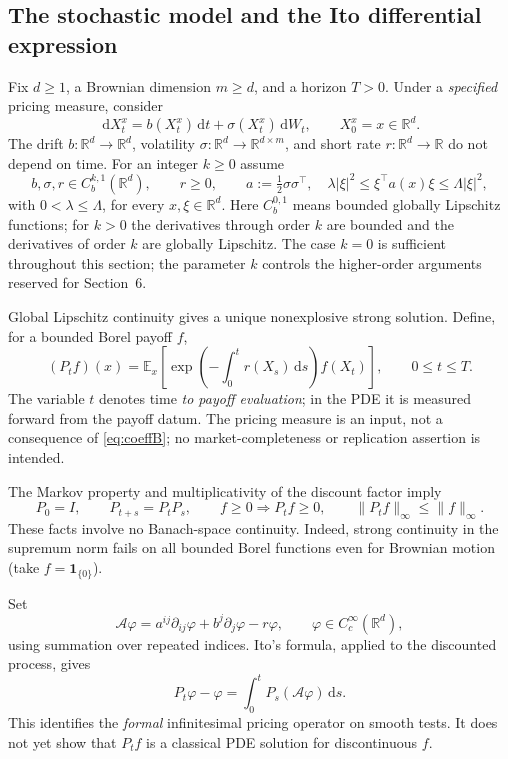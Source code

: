 \documentclass[11pt,a4paper]{article}
\theoremstyle{definition}\newtheorem{definition}{Definition}[section]\newtheorem{example}[theorem]{Example}
\theoremstyle{remark}\newtheorem{remark}[theorem]{Remark}\newtheorem{remarkSix}{Remark}[section]
\newcommand{\Rd}{\mathbb R^d}
\newcommand{\R}{\mathbb R}
\newcommand{\E}{\mathbb E}
\newcommand{\Cc}{C_c^\infty}
\newcommand{\dd}{\,\mathrm d}
\newcommand{\norm}[1]{\lVert #1\rVert}
\newcommand{\cA}{\mathcal A}
\begin{document}
\subsection{The stochastic model and the Ito differential expression}
\label{subsec:modelB}
Fix $d\ge1$, a Brownian dimension $m\ge d$, and a horizon $T>0$. Under a \emph{specified} pricing measure, consider
\begin{equation}\label{eq:sdeB}
\dd X_t^x=b(X_t^x)\dd t+\sigma(X_t^x)\dd W_t,
\qquad X_0^x=x\in\Rd.
\end{equation}
The drift $b:\Rd\to\Rd$, volatility $\sigma:\Rd\to\R^{d\times m}$, and short rate $r:\Rd\to\R$ do not depend on time. For an integer $k\ge0$ assume
\begin{equation}\label{eq:coeffB}
 b,\sigma,r\in C_b^{k,1}(\Rd),\qquad r\ge0,
 \qquad a:=\tfrac12\sigma\sigma^\top,
 \quad \lambda|\xi|^2\le\xi^\top a(x)\xi\le\Lambda|\xi|^2,
\end{equation}
with $0<\lambda\le\Lambda$, for every $x,\xi\in\Rd$. Here $C_b^{0,1}$ means bounded globally Lipschitz functions; for $k>0$ the derivatives through order $k$ are bounded and the derivatives of order $k$ are globally Lipschitz. The case $k=0$ is sufficient throughout this section; the parameter $k$ controls the higher-order arguments reserved for Section~6.

Global Lipschitz continuity gives a unique nonexplosive strong solution. Define, for a bounded Borel payoff $f$,
\begin{equation}\label{eq:PdefB}
 (P_tf)(x)=\E_x\!\left[
 \exp\!\left(-\int_0^t r(X_s)\dd s\right)f(X_t)
 \right],\qquad 0\le t\le T.
\end{equation}
The variable $t$ denotes time \emph{to payoff evaluation}; in the PDE it is measured forward from the payoff datum. The pricing measure is an input, not a consequence of \eqref{eq:coeffB}; no market-completeness or replication assertion is intended.

The Markov property and multiplicativity of the discount factor imply
\begin{equation}\label{eq:algB}
 P_0=I,\qquad P_{t+s}=P_tP_s,\qquad
 f\ge0\Longrightarrow P_tf\ge0,\qquad
 \norm{P_tf}_\infty\le\norm f_\infty.
\end{equation}
These facts involve no Banach-space continuity. Indeed, strong continuity in the supremum norm fails on all bounded Borel functions even for Brownian motion (take $f=\mathbf1_{\{0\}}$).

Set
\begin{equation}\label{eq:AB}
 \cA\varphi=a^{ij}\partial_{ij}\varphi+b^j\partial_j\varphi-r\varphi,
 \qquad \varphi\in\Cc(\Rd),
\end{equation}
using summation over repeated indices. Ito's formula, applied to the discounted process, gives
\begin{equation}\label{eq:dynkinB}
 P_t\varphi-\varphi=\int_0^tP_s(\cA\varphi)\dd s.
\end{equation}
This identifies the \emph{formal} infinitesimal pricing operator on smooth tests. It does not yet show that $P_tf$ is a classical PDE solution for discontinuous $f$.
\end{document}
